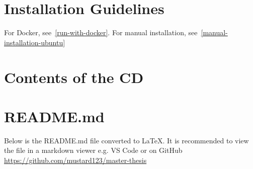 \appendix

\chapter{Installation Guidelines}
For Docker, see~\ref{run-with-docker}.
For manual installation, see~\ref{manual-installation-ubuntu}

\chapter{Contents of the CD}

\chapter{README.md}
Below is the README.md file converted to \LaTeX. It is 
recommended to view the file in a markdown viewer e.g. VS Code or on GitHub \url{https://github.com/mustard123/master-thesis}



